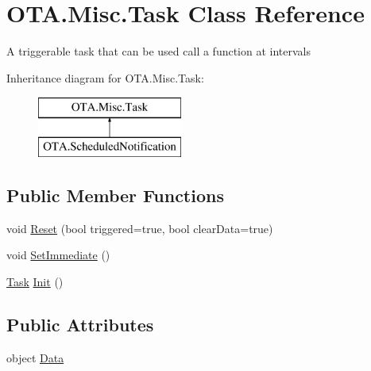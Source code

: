 \hypertarget{class_o_t_a_1_1_misc_1_1_task}{}\section{O\+T\+A.\+Misc.\+Task Class Reference}
\label{class_o_t_a_1_1_misc_1_1_task}


A triggerable task that can be used call a function at intervals  


Inheritance diagram for O\+T\+A.\+Misc.\+Task\+:\begin{figure}[H]
\begin{center}
\leavevmode
\includegraphics[height=2.000000cm]{class_o_t_a_1_1_misc_1_1_task}
\end{center}
\end{figure}
\subsection*{Public Member Functions}
\begin{DoxyCompactItemize}
\item 
void \hyperlink{class_o_t_a_1_1_misc_1_1_task_ae462959032bed8c8666411a901375db3}{Reset} (bool triggered=true, bool clear\+Data=true)
\item 
void \hyperlink{class_o_t_a_1_1_misc_1_1_task_a01871e8631d92a78fe3cf2bfb0c2a3a5}{Set\+Immediate} ()
\item 
\hyperlink{class_o_t_a_1_1_misc_1_1_task}{Task} \hyperlink{class_o_t_a_1_1_misc_1_1_task_a5c9d95791f3022be8b98ef3fbc25497e}{Init} ()
\end{DoxyCompactItemize}
\subsection*{Public Attributes}
\begin{DoxyCompactItemize}
\item 
object \hyperlink{class_o_t_a_1_1_misc_1_1_task_abd6edc6db04205c6d4f944e23a4bb97e}{Data}
\end{DoxyCompactItemize}
